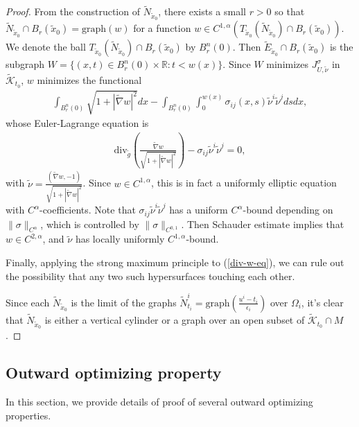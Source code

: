 \documentclass[11pt, letterpaper]{amsart}
\theoremstyle{definition}
\theoremstyle{remark}
\begin{document}
\begin{appendix}
\begin{proof}
	From the construction of $\tilde{N}_{\tilde{x}_0}$, there exists a small $r>0$ so that $\tilde{N}_{\tilde{x}_0} \cap B_r(\tilde{x}_0) = \mathrm{graph}(w)$ for a function $w \in C^{1,\alpha }( T_{\tilde{x}_0}(\tilde{N}_{\tilde{x}_0}) \cap B_r(\tilde{x}_0) ) $. We denote the ball $T_{\tilde{x}_0}(\tilde{N}_{\tilde{x}_0}) \cap B_r(\tilde{x}_0) $ by $B^{n}_r(0)$. Then $\tilde{E}_{\tilde{x}_0} \cap B_r(\tilde{x}_0) $ is the subgraph $W= \{(x, t) \in B^{n}_r(0)  \times \mathbb{R}: t< w(x)\} $. Since $W$ minimizes $J_{U, \tilde{\nu }} ^{\sigma }$ in $\tilde{\mathcal{K}}_{t_0}$, $w$ minimizes the functional
\begin{align*}
	\int_{B_r^{n}(0)} \sqrt{1+|\tilde{\nabla }w|^2} d x - \int_{B_r^n(0)} \int_{0}^{w(x)} \sigma _{ij}(x, s) \tilde{\nu }^{i} \tilde{\nu }^{j} d s d x,
\end{align*} 
whose Euler-Lagrange equation is 
\begin{align}\label{div-w-eq}
	\mathrm{div}_{\tilde{g}}\left( \frac{\tilde{\nabla }w}{\sqrt{1+|\tilde{\nabla }w|^2} } \right) - \sigma _{ij} \tilde{\nu }^{i} \tilde{\nu }^{j} =0,
\end{align}
with $\tilde{\nu } = \frac{(\tilde{\nabla }w, -1)}{\sqrt{1+|\tilde{\nabla }w|^2} }$. Since $w \in C^{1,\alpha }$, this is in fact a uniformly elliptic equation with $C^{\alpha }$-coefficients. Note that $\sigma _{ij} \tilde{\nu }^{i} \tilde{\nu }^{j}$ has a uniform $C^{\alpha }$-bound depending on $\|\sigma \|_{C^{\alpha }}$, which is controlled by $\|\sigma \|_{C^{0,1}}$. Then Schauder estimate implies that $w \in C^{2,\alpha }$, and  $\tilde{\nu }$  has locally uniformly $C^{1, \alpha }$-bound.

Finally, applying the strong maximum principle to (\ref{div-w-eq}), we can rule out the possibility that any two such hypersurfaces touching each other. 

Since each $\tilde{N}_{\tilde{x}_0}$ is the limit of the graphs $\tilde{N}^{i}_{t_i}= \mathrm{graph}\left( \frac{u^{i} - t_i}{\epsilon _i} \right) $ over $\Omega _i$, it's clear that $\tilde{N}_{\tilde{x}_0}$ is either a vertical cylinder or a graph over an open subset of $\tilde{\mathcal{K}}_{t_0} \cap M$.
\end{proof}



\subsection{Outward optimizing property}\label{appen-optimizing}
In this section, we provide details of proof of several outward optimizing properties. 


\end{appendix}
\end{document}
